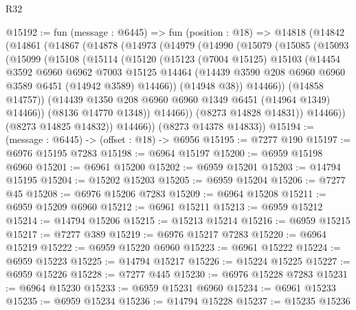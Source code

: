 \begin{lexlean}{R32}
\begin{coremodule}
@15192 := fun (message : @6445) =>
  fun (position : @18) =>
  @14818
    (@14842
      (@14861
        (@14867
          (@14878
            (@14973
              (@14979
                (@14990
                  (@15079
                    (@15085
                      (@15093
                        (@15099
                          (@15108
                            (@15114
                              (@15120
                                (@15123
                                  (@7004 @15125)
                                  @15103
                                  (@14454
                                    @3592
                                    @6960
                                    @6962
                                    @7003
                                    @15125
                                    @14464
                                    (@14439
                                      @3590
                                      @208
                                      @6960
                                      @6960
                                      @3589
                                      @6451
                                      (@14942 @3589)
                                      @14466))
                                  (@14948 @38))
                                @14466))
                            (@14858 @14757))
                          (@14439 @1350 @208 @6960 @6960 @1349 @6451 (@14964 @1349) @14466))
                        (@8136 @14770 @1348))
                      @14466))
                  (@8273 @14828 @14831))
                @14466))
            (@8273 @14825 @14832))
          @14466))
      (@8273 @14378 @14833))
@15194 := (message : @6445) -> (offset : @18) -> @6956
@15195 := @7277 @190
@15197 := @6976 @15195 @7283
@15198 := @6964 @15197
@15200 := @6959 @15198 @6960
@15201 := @6961 @15200
@15202 := @6959 @15201
@15203 := @14794 @15195
@15204 := @15202 @15203
@15205 := @6959 @15204
@15206 := @7277 @45
@15208 := @6976 @15206 @7283
@15209 := @6964 @15208
@15211 := @6959 @15209 @6960
@15212 := @6961 @15211
@15213 := @6959 @15212
@15214 := @14794 @15206
@15215 := @15213 @15214
@15216 := @6959 @15215
@15217 := @7277 @389
@15219 := @6976 @15217 @7283
@15220 := @6964 @15219
@15222 := @6959 @15220 @6960
@15223 := @6961 @15222
@15224 := @6959 @15223
@15225 := @14794 @15217
@15226 := @15224 @15225
@15227 := @6959 @15226
@15228 := @7277 @445
@15230 := @6976 @15228 @7283
@15231 := @6964 @15230
@15233 := @6959 @15231 @6960
@15234 := @6961 @15233
@15235 := @6959 @15234
@15236 := @14794 @15228
@15237 := @15235 @15236

\end{coremodule}
\end{lexlean}
